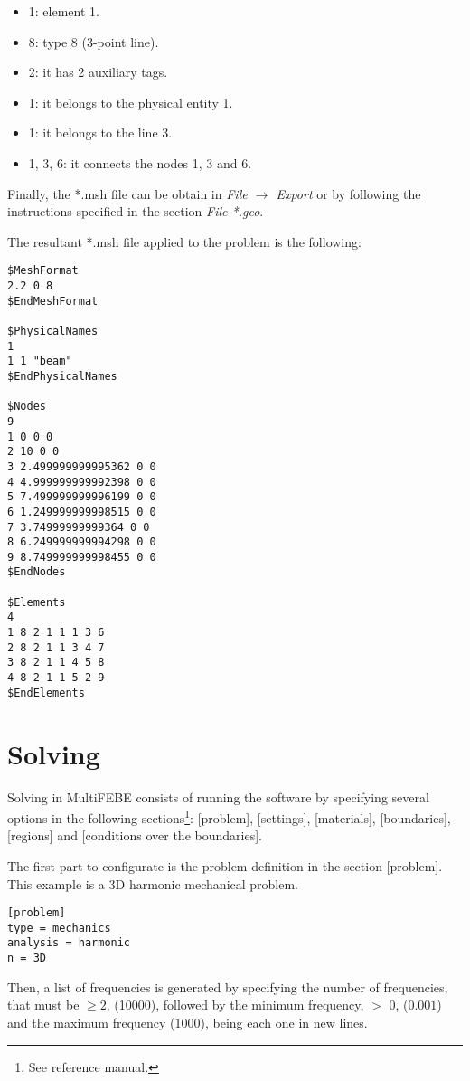 \documentclass[a4]{article}
\begin{document}
\begin{itemize}
	\item 1: element 1.
	\item 8: type 8 (3-point line).
	\item 2: it has 2 auxiliary tags.
	\item 1: it belongs to the physical entity 1.
	\item 1: it belongs to the line 3.
	\item 1, 3, 6: it connects the nodes 1, 3 and 6.
\end{itemize} 

Finally, the *.msh file can be obtain in  \textit{File $\to$ Export} or by following the instructions specified in the section \textit{File *.geo}.

The resultant *.msh file applied to the problem is the following:

\begin{Verbatim}
$MeshFormat
2.2 0 8
$EndMeshFormat

$PhysicalNames
1
1 1 "beam"
$EndPhysicalNames

$Nodes
9
1 0 0 0
2 10 0 0
3 2.499999999995362 0 0
4 4.999999999992398 0 0
5 7.499999999996199 0 0
6 1.249999999998515 0 0
7 3.74999999999364 0 0
8 6.249999999994298 0 0
9 8.749999999998455 0 0
$EndNodes

$Elements
4
1 8 2 1 1 1 3 6
2 8 2 1 1 3 4 7
3 8 2 1 1 4 5 8
4 8 2 1 1 5 2 9
$EndElements
\end{Verbatim}

\section{Solving}
Solving in MultiFEBE consists of running the software by specifying several options in the following sections\footnote{See reference manual.}: [problem], [settings], [materials], [boundaries], [regions] and [conditions over the boundaries].

The first part to configurate is the problem definition in the section [problem]. This example is a 3D harmonic mechanical problem.  

\begin{Verbatim}	
[problem]
type = mechanics
analysis = harmonic
n = 3D
\end{Verbatim}

Then, a list of frequencies is generated by specifying the number of frequencies, that must be $\geq 2$, (10000), followed by the minimum frequency, $>$ 0, ($0.001$) and the maximum frequency ($1000$), being each one in new lines.
\end{document}
